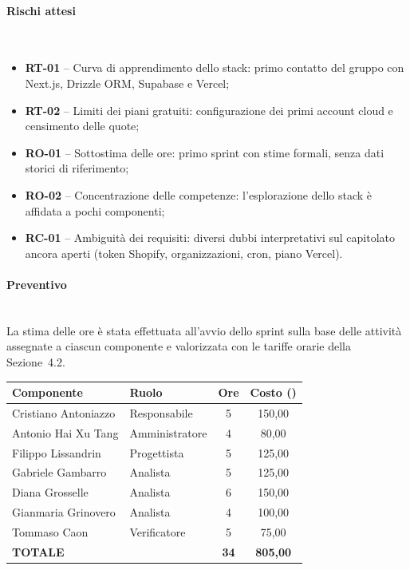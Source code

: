 \paragraph{Rischi attesi}~\\[0.15cm]
\begin{itemize}
    \item \textbf{RT-01} -- Curva di apprendimento dello stack: primo contatto del gruppo con Next.js, Drizzle ORM, Supabase e Vercel;
    \item \textbf{RT-02} -- Limiti dei piani gratuiti: configurazione dei primi account cloud e censimento delle quote;
    \item \textbf{RO-01} -- Sottostima delle ore: primo sprint con stime formali, senza dati storici di riferimento;
    \item \textbf{RO-02} -- Concentrazione delle competenze: l'esplorazione dello stack è affidata a pochi componenti;
    \item \textbf{RC-01} -- Ambiguità dei requisiti: diversi dubbi interpretativi sul capitolato ancora aperti (token Shopify, organizzazioni, cron, piano Vercel).
\end{itemize}

\paragraph{Preventivo}~\\[0.15cm]
La stima delle ore è stata effettuata all'avvio dello sprint sulla base delle attività assegnate a ciascun componente e valorizzata con le tariffe orarie della Sezione~4.2.

\vspace{2mm}
\renewcommand{\arraystretch}{1.3}
\noindent
\begin{tabularx}{\textwidth}{|X l c c|}
\hline
\textbf{Componente} & \textbf{Ruolo} & \textbf{Ore} & \textbf{Costo (\texteuro{})} \\
\hline
Cristiano Antoniazzo & Responsabile & 5 & 150,00 \\
Antonio Hai Xu Tang & Amministratore & 4 & 80,00 \\
Filippo Lissandrin & Progettista & 5 & 125,00 \\
Gabriele Gambarro & Analista & 5 & 125,00 \\
Diana Grosselle & Analista & 6 & 150,00 \\
Gianmaria Grinovero & Analista & 4 & 100,00 \\
Tommaso Caon & Verificatore & 5 & 75,00 \\
\hline
\textbf{TOTALE} & & \textbf{34} & \textbf{805,00} \\
\hline
\end{tabularx}


